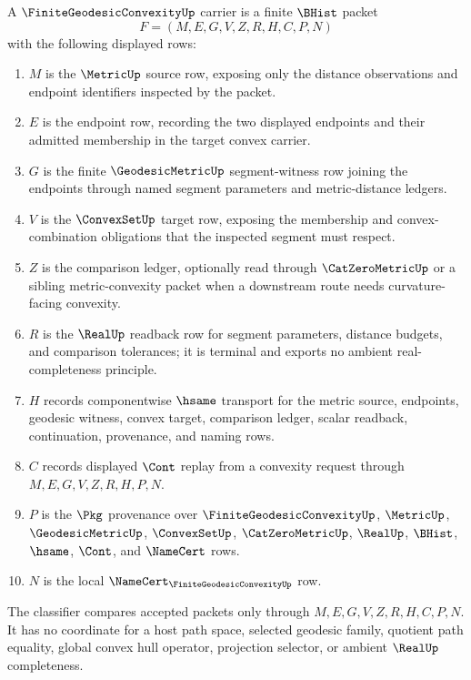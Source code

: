 \begin{definition}
\label{def:finite-geodesic-convexity-carrier}
A $\FiniteGeodesicConvexityUp$ carrier is a finite $\BHist$ packet
$$
F=(M,E,G,V,Z,R,H,C,P,N)
$$
with the following displayed rows:
\begin{enumerate}
\item $M$ is the $\MetricUp$ source row, exposing only the distance observations and endpoint identifiers inspected by the packet.
\item $E$ is the endpoint row, recording the two displayed endpoints and their admitted membership in the target convex carrier.
\item $G$ is the finite $\GeodesicMetricUp$ segment-witness row joining the endpoints through named segment parameters and metric-distance ledgers.
\item $V$ is the $\ConvexSetUp$ target row, exposing the membership and convex-combination obligations that the inspected segment must respect.
\item $Z$ is the comparison ledger, optionally read through $\CatZeroMetricUp$ or a sibling metric-convexity packet when a downstream route needs curvature-facing convexity.
\item $R$ is the $\RealUp$ readback row for segment parameters, distance budgets, and comparison tolerances; it is terminal and exports no ambient real-completeness principle.
\item $H$ records componentwise $\hsame$ transport for the metric source, endpoints, geodesic witness, convex target, comparison ledger, scalar readback, continuation, provenance, and naming rows.
\item $C$ records displayed $\Cont$ replay from a convexity request through $M,E,G,V,Z,R,H,P,N$.
\item $P$ is the $\Pkg$ provenance over $\FiniteGeodesicConvexityUp$, $\MetricUp$, $\GeodesicMetricUp$, $\ConvexSetUp$, $\CatZeroMetricUp$, $\RealUp$, $\BHist$, $\hsame$, $\Cont$, and $\NameCert$ rows.
\item $N$ is the local $\NameCert_{\FiniteGeodesicConvexityUp}$ row.
\end{enumerate}
The classifier compares accepted packets only through $M,E,G,V,Z,R,H,C,P,N$. It has no coordinate for a host path space, selected geodesic family, quotient path equality, global convex hull operator, projection selector, or ambient $\RealUp$ completeness.
\end{definition}

